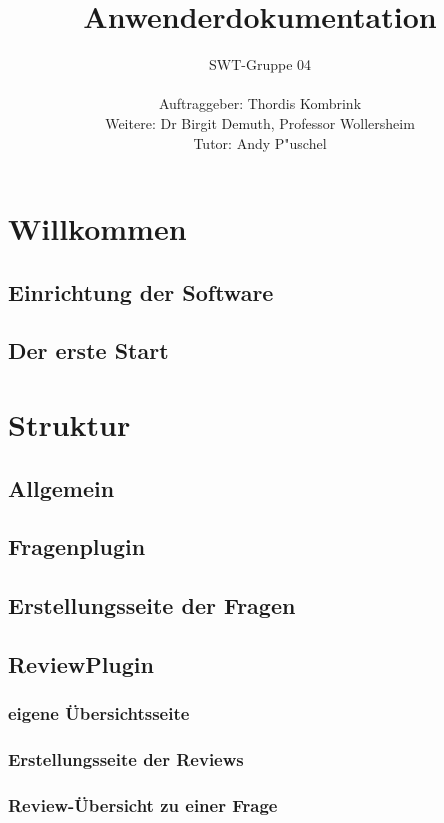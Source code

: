 \documentclass[12pt,a4paper]{scrreprt}
\begin{document}
\title{Anwenderdokumentation}

\author{SWT-Gruppe 04\\ \\Auftraggeber: Thordis Kombrink\\Weitere: Dr Birgit Demuth, Professor Wollersheim\\Tutor: Andy P"uschel}
\maketitle
\tableofcontents

\chapter{Willkommen}
	\section{Einrichtung der Software}
	\section{Der erste Start}

\chapter{Struktur}
\section{Allgemein}
\section{Fragenplugin}
\section{Erstellungsseite der Fragen}
\section{ReviewPlugin}
\subsection{eigene \"Ubersichtsseite}	
\subsection{Erstellungsseite der Reviews}
\subsection{Review-\"Ubersicht zu einer Frage}
\end{document}
